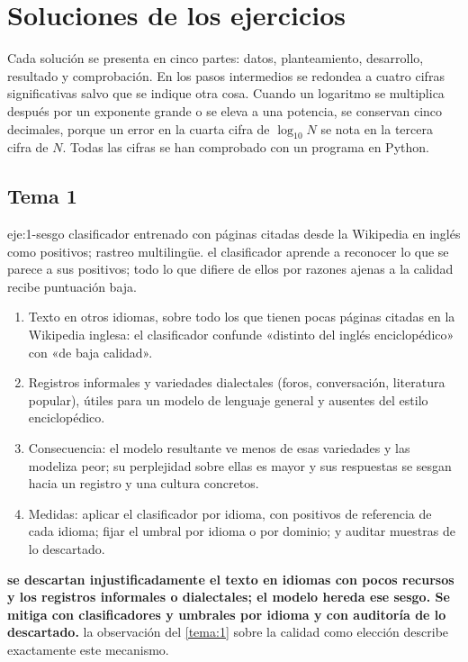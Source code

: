 \chapter{Soluciones de los ejercicios}
\label{ap:soluciones}

Cada solución se presenta en cinco partes: datos, planteamiento, desarrollo, resultado y comprobación. En los pasos intermedios se redondea a cuatro cifras significativas salvo que se indique otra cosa. Cuando un logaritmo se multiplica después por un exponente grande o se eleva a una potencia, se conservan cinco decimales, porque un error en la cuarta cifra de $\log_{10}N$ se nota en la tercera cifra de $N$. Todas las cifras se han comprobado con un programa en Python.

\section{Tema 1}

\begin{solucion}{eje:1-sesgo}
\datos clasificador entrenado con páginas citadas desde la Wikipedia en inglés como positivos; rastreo multilingüe.
\planteamiento el clasificador aprende a reconocer lo que se parece a sus positivos; todo lo que difiere de ellos por razones ajenas a la calidad recibe puntuación baja.
\pasos
\begin{enumerate}[label=\arabic*.]
  \item Texto en otros idiomas, sobre todo los que tienen pocas páginas citadas en la Wikipedia inglesa: el clasificador confunde «distinto del inglés enciclopédico» con «de baja calidad».
  \item Registros informales y variedades dialectales (foros, conversación, literatura popular), útiles para un modelo de lenguaje general y ausentes del estilo enciclopédico.
  \item Consecuencia: el modelo resultante ve menos de esas variedades y las modeliza peor; su perplejidad sobre ellas es mayor y sus respuestas se sesgan hacia un registro y una cultura concretos.
  \item Medidas: aplicar el clasificador por idioma, con positivos de referencia de cada idioma; fijar el umbral por idioma o por dominio; y auditar muestras de lo descartado.
\end{enumerate}
\resultado \textbf{se descartan injustificadamente el texto en idiomas con pocos recursos y los registros informales o dialectales; el modelo hereda ese sesgo. Se mitiga con clasificadores y umbrales por idioma y con auditoría de lo descartado.}
\comprobacion la observación del \cref{tema:1} sobre la calidad como elección describe exactamente este mecanismo.
\end{solucion}

